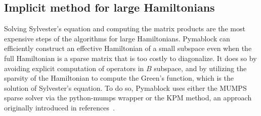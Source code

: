 \subsection{Implicit method for large Hamiltonians}

Solving Sylvester's equation and computing the matrix products are the most
expensive steps of the algorithms for large Hamiltonians.
Pymablock can efficiently construct an effective Hamiltonian of a small
subspace even when the full Hamiltonian is a sparse matrix that is too costly to
diagonalize.
It does so by avoiding explicit computation of operators in $B$ subspace, and
by utilizing the sparsity of the Hamiltonian to compute the Green's function,
which is the solution of Sylvester's equation.
To do so, Pymablock uses either the MUMPS sparse solver via the python-mumps
wrapper or the KPM method, an approach originally introduced in
references~\cite{Weisse_2006, Irfan_2019}.
